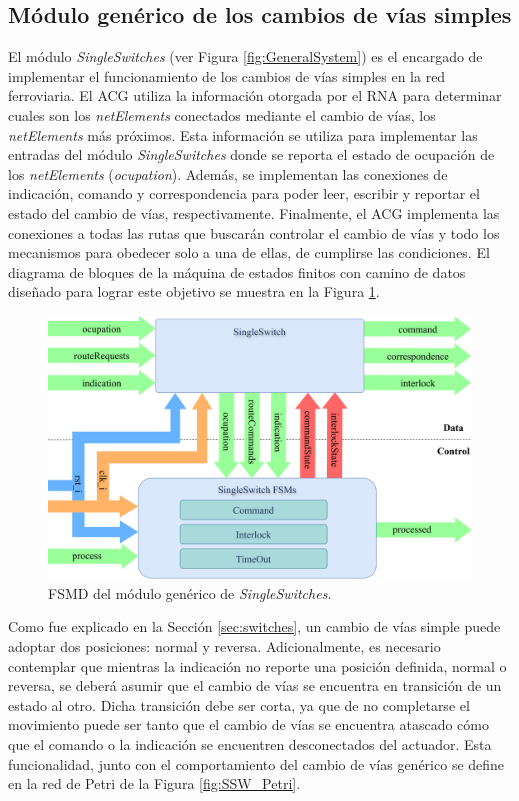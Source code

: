 \subsection{Módulo genérico de los cambios de vías simples}
	\label{sec:ACG_ssw}
	
	El módulo \textit{SingleSwitches} (ver Figura \ref{fig:GeneralSystem}) es el encargado de implementar el funcionamiento de los cambios de vías simples en la red ferroviaria. El ACG utiliza la información otorgada por el RNA para determinar cuales son los \textit{netElements} conectados mediante el cambio de vías, los \textit{netElements} más próximos. Esta información se utiliza para implementar las entradas del módulo \textit{SingleSwitches} donde se reporta el estado de ocupación de los \textit{netElements} (\textit{ocupation}). Además, se implementan las conexiones de indicación, comando y correspondencia para poder leer, escribir y reportar el estado del cambio de vías, respectivamente. Finalmente, el ACG implementa las conexiones a todas las rutas que buscarán controlar el cambio de vías y todo los mecanismos para obedecer solo a una de ellas, de cumplirse las condiciones. El diagrama de bloques de la máquina de estados finitos con camino de datos diseñado para lograr este objetivo se muestra en la Figura \ref{fig:SSW_module}.
	
	\begin{figure}[H]
		\centering
		\includegraphics[width=1\textwidth]{Figuras/SSW_module}
		\centering\caption{FSMD del módulo genérico de \textit{SingleSwitches}.}
		\label{fig:SSW_module}
	\end{figure}
	
	Como fue explicado en la Sección \ref{sec:switches}, un cambio de vías simple puede adoptar dos posiciones: normal y reversa. Adicionalmente, es necesario contemplar que mientras la indicación no reporte una posición definida, normal o reversa, se deberá asumir que el cambio de vías se encuentra en transición de un estado al otro. Dicha transición debe ser corta, ya que de no completarse el movimiento puede ser tanto que el cambio de vías se encuentra atascado cómo que el comando o la indicación se encuentren desconectados del actuador. Esta funcionalidad, junto con el comportamiento del cambio de vías genérico se define en la red de Petri de la Figura \ref{fig:SSW_Petri}.
	
